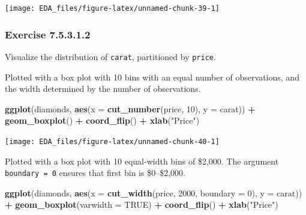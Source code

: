 \documentclass[]{book}
\newenvironment{Shaded}{\begin{snugshade}}{\end{snugshade}}
\newcommand{\DataTypeTok}[1]{\textcolor[rgb]{0.13,0.29,0.53}{#1}}
\newcommand{\DecValTok}[1]{\textcolor[rgb]{0.00,0.00,0.81}{#1}}
\newcommand{\KeywordTok}[1]{\textcolor[rgb]{0.13,0.29,0.53}{\textbf{#1}}}
\newcommand{\NormalTok}[1]{#1}
\newcommand{\OperatorTok}[1]{\textcolor[rgb]{0.81,0.36,0.00}{\textbf{#1}}}
\newcommand{\OtherTok}[1]{\textcolor[rgb]{0.56,0.35,0.01}{#1}}
\newcommand{\StringTok}[1]{\textcolor[rgb]{0.31,0.60,0.02}{#1}}
\theoremstyle{plain}
\theoremstyle{remark}
\begin{document}
\begin{center}\texttt{[image: EDA\_files/figure-latex/unnamed-chunk-39-1]} \end{center}

\hypertarget{exercise-7.5.3.1.2}{%
\subsubsection*{\texorpdfstring{Exercise {7.5.3.1.2}}{Exercise 7.5.3.1.2}}\label{exercise-7.5.3.1.2}}

Visualize the distribution of \texttt{carat}, partitioned by \texttt{price}.

Plotted with a box plot with 10 bins with an equal number of observations, and the width determined by the number of observations.

\begin{Shaded}
\begin{Highlighting}[]
\KeywordTok{ggplot}\NormalTok{(diamonds, }\KeywordTok{aes}\NormalTok{(}\DataTypeTok{x =} \KeywordTok{cut_number}\NormalTok{(price, }\DecValTok{10}\NormalTok{), }\DataTypeTok{y =}\NormalTok{ carat)) }\OperatorTok{+}
\StringTok{  }\KeywordTok{geom_boxplot}\NormalTok{() }\OperatorTok{+}
\StringTok{  }\KeywordTok{coord_flip}\NormalTok{() }\OperatorTok{+}
\StringTok{  }\KeywordTok{xlab}\NormalTok{(}\StringTok{"Price"}\NormalTok{)}
\end{Highlighting}
\end{Shaded}

\begin{center}\texttt{[image: EDA\_files/figure-latex/unnamed-chunk-40-1]} \end{center}

Plotted with a box plot with 10 equal-width bins of \$2,000. The argument \texttt{boundary\ =\ 0} ensures that first bin is \$0--\$2,000.

\begin{Shaded}
\begin{Highlighting}[]
\KeywordTok{ggplot}\NormalTok{(diamonds, }\KeywordTok{aes}\NormalTok{(}\DataTypeTok{x =} \KeywordTok{cut_width}\NormalTok{(price, }\DecValTok{2000}\NormalTok{, }\DataTypeTok{boundary =} \DecValTok{0}\NormalTok{), }\DataTypeTok{y =}\NormalTok{ carat)) }\OperatorTok{+}
\StringTok{  }\KeywordTok{geom_boxplot}\NormalTok{(}\DataTypeTok{varwidth =} \OtherTok{TRUE}\NormalTok{) }\OperatorTok{+}
\StringTok{  }\KeywordTok{coord_flip}\NormalTok{() }\OperatorTok{+}
\StringTok{  }\KeywordTok{xlab}\NormalTok{(}\StringTok{"Price"}\NormalTok{)}
\end{Highlighting}
\end{Shaded}
\end{document}
